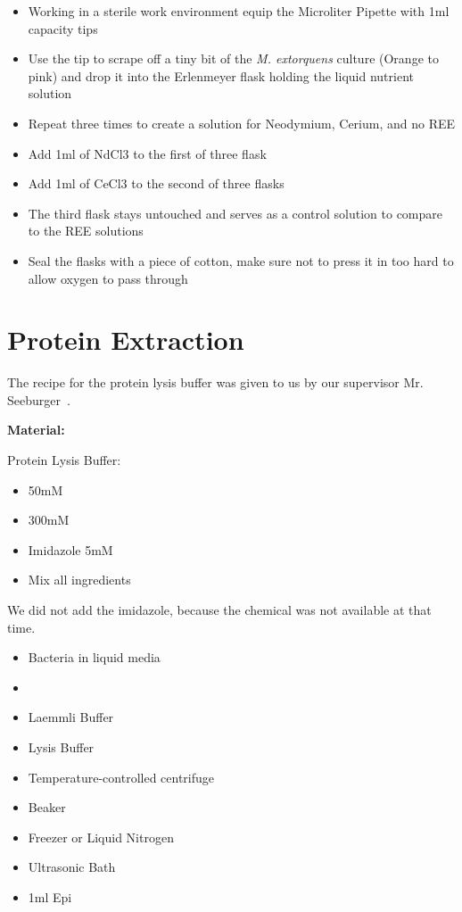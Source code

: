 \begin{itemize}
    \item Working in a sterile work environment equip the Microliter Pipette with 1ml
    capacity tips
    \item Use the tip to scrape off a tiny bit of the \emph{M. extorquens} culture (Orange to
    pink) and drop it into the Erlenmeyer flask holding the liquid nutrient solution
    \item Repeat three times to create a solution for Neodymium, Cerium, and no REE
    \item Add 1ml of NdCl3 to the first of three flask
    \item Add 1ml of CeCl3 to the second of three flasks
    \item The third flask stays untouched and serves as a control solution to compare
    to the REE solutions
    \item Seal the flasks with a piece of cotton, make sure not to press it in too hard to
    allow oxygen to pass through
\end{itemize}


\section{Protein Extraction\authorB}
The recipe for the protein lysis buffer was given to us by our supervisor Mr. Seeburger~\cite[p. 52]{lysisbuffer}.

\textbf{Material:}

Protein Lysis Buffer:

\begin{itemize}
    \item {} 50mM
    \item {} 300mM
    \item Imidazole 5mM
    \item Mix all ingredients
\end{itemize}

We did not add the imidazole, because the chemical was not available at that time.

\begin{itemize}
    \item Bacteria in liquid media
    \item {}
    \item Laemmli Buffer
    \item Lysis Buffer
    \item Temperature-controlled centrifuge
    \item Beaker
    \item Freezer or Liquid Nitrogen
    \item Ultrasonic Bath
    \item 1ml Epi
\end{itemize}

